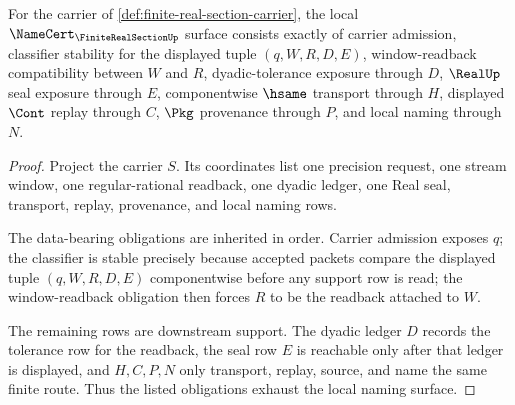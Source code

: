 \begin{theorem}
\label{thm:finite-real-section-obligation-surface}
For the carrier of \autoref{def:finite-real-section-carrier}, the local $\NameCert_{\FiniteRealSectionUp}$ surface consists exactly of carrier admission, classifier stability for the displayed tuple $(q,W,R,D,E)$, window-readback compatibility between $W$ and $R$, dyadic-tolerance exposure through $D$, $\RealUp$ seal exposure through $E$, componentwise $\hsame$ transport through $H$, displayed $\Cont$ replay through $C$, $\Pkg$ provenance through $P$, and local naming through $N$.
\end{theorem}
\begin{proof}
Project the carrier $S$. Its coordinates list one precision request, one stream window, one regular-rational readback, one dyadic ledger, one Real seal, transport, replay, provenance, and local naming rows.

The data-bearing obligations are inherited in order. Carrier admission exposes $q$; the classifier is stable precisely because accepted packets compare the displayed tuple $(q,W,R,D,E)$ componentwise before any support row is read; the window-readback obligation then forces $R$ to be the readback attached to $W$.

The remaining rows are downstream support. The dyadic ledger $D$ records the tolerance row for the readback, the seal row $E$ is reachable only after that ledger is displayed, and $H,C,P,N$ only transport, replay, source, and name the same finite route. Thus the listed obligations exhaust the local naming surface.
\end{proof}

